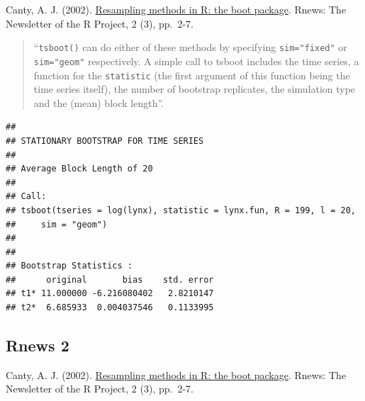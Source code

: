 \documentclass[]{book}
\newenvironment{Shaded}{\begin{snugshade}}{\end{snugshade}}
\newcommand{\KeywordTok}[1]{\textcolor[rgb]{0.13,0.29,0.53}{\textbf{#1}}}
\newcommand{\DataTypeTok}[1]{\textcolor[rgb]{0.13,0.29,0.53}{#1}}
\newcommand{\DecValTok}[1]{\textcolor[rgb]{0.00,0.00,0.81}{#1}}
\newcommand{\StringTok}[1]{\textcolor[rgb]{0.31,0.60,0.02}{#1}}
\newcommand{\CommentTok}[1]{\textcolor[rgb]{0.56,0.35,0.01}{\textit{#1}}}
\newcommand{\ControlFlowTok}[1]{\textcolor[rgb]{0.13,0.29,0.53}{\textbf{#1}}}
\newcommand{\OperatorTok}[1]{\textcolor[rgb]{0.81,0.36,0.00}{\textbf{#1}}}
\newcommand{\NormalTok}[1]{#1}
\theoremstyle{definition}
\theoremstyle{definition}
\theoremstyle{definition}
\theoremstyle{remark}
\begin{document}
Canty, A. J. (2002).
\href{http://cran.fhcrc.org/doc/Rnews/Rnews_2002-3.pdf}{Resampling
methods in R: the boot package}. Rnews: The Newsletter of the R Project,
2 (3), pp.~2-7.

\begin{quote}
``\texttt{tsboot()} can do either of these methods by specifying
\texttt{sim="fixed"} or \texttt{sim="geom"} respectively. A simple call
to tsboot includes the time series, a function for the
\texttt{statistic} (the first argument of this function being the time
series itself), the number of bootstrap replicates, the simulation type
and the (mean) block length''.
\end{quote}

\begin{Shaded}
\end{Shaded}

\begin{verbatim}
## 
## STATIONARY BOOTSTRAP FOR TIME SERIES
## 
## Average Block Length of 20 
## 
## Call:
## tsboot(tseries = log(lynx), statistic = lynx.fun, R = 199, l = 20, 
##     sim = "geom")
## 
## 
## Bootstrap Statistics :
##      original       bias    std. error
## t1* 11.000000 -6.216080402   2.8210147
## t2*  6.685933  0.004037546   0.1133995
\end{verbatim}

\subsection{Rnews 2}\label{rnews-2}

Canty, A. J. (2002).
\href{http://cran.fhcrc.org/doc/Rnews/Rnews_2002-3.pdf}{Resampling
methods in R: the boot package}. Rnews: The Newsletter of the R Project,
2 (3), pp.~2-7.
\end{document}
